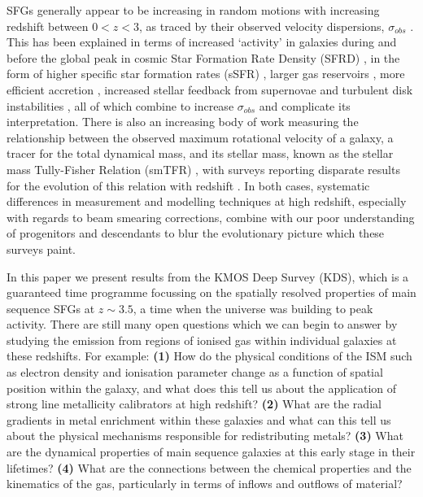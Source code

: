 \documentclass[fleqn,usenatbib]{mn2e}
\begin{document}
SFGs generally appear to be increasing in random motions with increasing redshift between $0 < z < 3$, as traced by their observed velocity dispersions, $\sigma_{obs}$ \citep{Genzel2008,ForsterSchreiber2009,Law2009,Cresci2009,Gnerucci2011,Epinat2012,Kassin2012,Green2014,Wisnioski2015,Stott2016}.
This has been explained in terms of increased `activity' in galaxies during and before the global peak in cosmic Star Formation Rate Density (SFRD) \citep{Madau_2014}, in the form of higher specific star formation rates (sSFR) \citep{Wisnioski2015}, larger gas reservoirs \citep{Law2009,ForsterSchreiber2009,Wisnioski2015,Stott2016}, more efficient accretion \citep{Law2009}, increased stellar feedback from supernovae \citep{Kassin2012} and turbulent disk instabilities \citep{Law2009,Bournaud2007,Bournaud2016}, all of which combine to increase $\sigma_{obs}$ and complicate its interpretation.
There is also an increasing body of work measuring the relationship between the observed maximum rotational velocity of a galaxy, a tracer for the total dynamical mass, and its stellar mass, known as the stellar mass Tully-Fisher Relation (smTFR) \citep{Tully1977}, with surveys reporting disparate results for the evolution of this relation with redshift \citep[e.g.][]{Puech2008,Miller2011,Gnerucci2011,Tiley2016a,Harrison2017}.
In both cases, systematic differences in measurement and modelling techniques at high redshift, especially with regards to beam smearing corrections, combine with our poor understanding of progenitors and descendants to blur the evolutionary picture which these surveys paint.

In this paper we present results from the KMOS Deep Survey (KDS), which is a guaranteed time programme focussing on the spatially resolved properties of main sequence SFGs at $z\sim3.5$, a time when the universe was building to peak activity.
There are still many open questions which we can begin to answer by studying the emission from regions of ionised gas within individual galaxies at these redshifts.
For example: \textbf{(1)} How do the physical conditions of the ISM such as electron density and ionisation parameter change as a function of spatial position within the galaxy, and what does this tell us about the application of strong line metallicity calibrators at high redshift?
\textbf{(2)} What are the radial gradients in metal enrichment within these galaxies and what can this tell us about the physical mechanisms responsible for redistributing metals?
\textbf{(3)} What are the dynamical properties of main sequence galaxies at this early stage in their lifetimes? 
\textbf{(4)} What are the connections between the chemical properties and the kinematics of the gas, particularly in terms of inflows and outflows of material?
\end{document}
